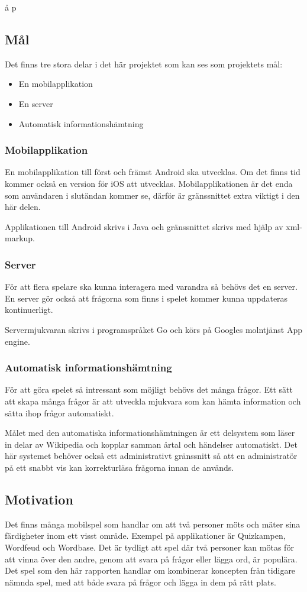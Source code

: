 å p\documentclass[swedish,12pt,a4paper]{article}
\begin{document}
\subsection{Mål}
Det finns tre stora delar i det här projektet som kan ses som projektets mål:
\begin{itemize}
\item En mobilapplikation
\item En server
\item Automatisk informationshämtning
\end{itemize}

\subsubsection{Mobilapplikation}
En mobilapplikation till först och främst Android ska utvecklas. Om det finns tid kommer också en version för iOS att utvecklas. Mobilapplikationen är det enda som användaren i slutändan kommer se, därför är gränssnittet extra viktigt i den här delen. 

Applikationen till Android skrivs i Java och gränssnittet skrivs med hjälp av xml-markup.

\subsubsection{Server}
För att flera spelare ska kunna interagera med varandra så behövs det en server. En server gör också att frågorna som finns i spelet kommer kunna uppdateras kontinuerligt.

Servermjukvaran skrivs i programspråket Go och körs på Googles molntjänst App engine.

\subsubsection{Automatisk informationshämtning}
För att göra spelet så intressant som möjligt behövs det många frågor. Ett sätt att skapa många frågor är att utveckla mjukvara som kan hämta information och sätta ihop frågor automatiskt. 

Målet med den automatiska informationshämtningen är ett delsystem som läser in delar av Wikipedia och kopplar samman årtal och händelser automatiskt. Det här systemet behöver också ett administrativt gränssnitt så att en administratör på ett snabbt vis kan korrekturläsa frågorna innan de används.

\subsection{Motivation}
Det finns många mobilspel som handlar om att två personer möts och mäter sina färdigheter inom ett visst område. Exempel på applikationer är Quizkampen, Wordfeud och Wordbase. Det är tydligt att spel där två personer kan mötas för att vinna över den andre, genom att svara på frågor eller lägga ord, är populära. Det spel som den här rapporten handlar om kombinerar koncepten från tidigare nämnda spel, med att både svara på frågor och lägga in dem på rätt plats. 
\end{document}
